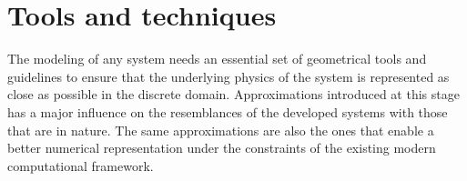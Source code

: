 \chapter{Tools and techniques}
The modeling of any system needs an essential set of geometrical tools and guidelines to ensure that the underlying physics of the system is represented as close as possible in the discrete domain. Approximations introduced at this stage has a major influence on the resemblances of the developed systems with those that are in nature. The same approximations are also the ones that enable a better numerical representation under the constraints of the existing modern computational framework. 